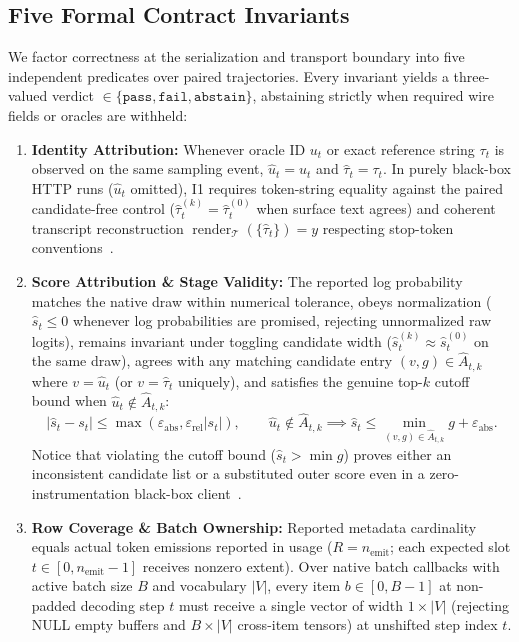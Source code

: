\documentclass[11pt,letterpaper]{article}
\begin{document}
\subsection{Five Formal Contract Invariants}
We factor correctness at the serialization and transport boundary into five independent predicates over paired trajectories. Every invariant yields a three-valued verdict $\in \{\texttt{pass}, \texttt{fail}, \texttt{abstain}\}$, abstaining strictly when required wire fields or oracles are withheld:
\begin{enumerate}
\item[\textbf{I1}] \textbf{Identity Attribution:} Whenever oracle ID $u_t$ or exact reference string $\tau_t$ is observed on the same sampling event, $\hat{u}_t = u_t$ and $\hat{\tau}_t = \tau_t$. In purely black-box HTTP runs ($\hat{u}_t$ omitted), \textsc{I1} requires token-string equality against the paired candidate-free control ($\hat{\tau}_t^{(k)} = \hat{\tau}_t^{(0)}$ when surface text agrees) and coherent transcript reconstruction $\operatorname{render}_{\mathcal{T}}(\{\hat{\tau}_t\}) = y$ respecting stop-token conventions~\cite{chatschema}.
\item[\textbf{I2}] \textbf{Score Attribution \& Stage Validity:} The reported log probability matches the native draw within numerical tolerance, obeys normalization ($\hat{s}_t \le 0$ whenever log probabilities are promised, rejecting unnormalized raw logits), remains invariant under toggling candidate width ($\hat{s}_t^{(k)} \approx \hat{s}_t^{(0)}$ on the same draw), agrees with any matching candidate entry $(v,g) \in \hat{A}_{t,k}$ where $v = \hat{u}_t$ (or $v = \hat{\tau}_t$ uniquely), and satisfies the genuine top-$k$ cutoff bound when $\hat{u}_t \notin \hat{A}_{t,k}$:
\begin{equation}
|\hat{s}_t - s_t| \le \max(\varepsilon_{\text{abs}}, \varepsilon_{\text{rel}} |s_t|), \qquad \hat{u}_t \notin \hat{A}_{t,k} \implies \hat{s}_t \le \min_{(v,g)\in \hat{A}_{t,k}} g + \varepsilon_{\text{abs}}.
\end{equation}
Notice that violating the cutoff bound ($\hat{s}_t > \min g$) proves either an inconsistent candidate list or a substituted outer score even in a zero-instrumentation black-box client~\cite{ollamarel,openai}.
\item[\textbf{I3}] \textbf{Row Coverage \& Batch Ownership:} Reported metadata cardinality equals actual token emissions reported in usage ($R = n_{\text{emit}}$; each expected slot $t \in [0, n_{\text{emit}}-1]$ receives nonzero extent). Over native batch callbacks with active batch size $B$ and vocabulary $|V|$, every item $b \in [0, B-1]$ at non-padded decoding step $t$ must receive a single vector of width $1 \times |V|$ (rejecting NULL empty buffers and $B \times |V|$ cross-item tensors) at unshifted step index $t$.

\end{enumerate}
\end{document}
